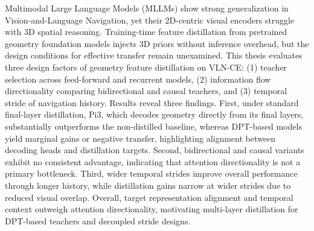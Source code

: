 Multimodal Large Language Models (MLLMs) show strong generalization in Vision-and-Language Navigation, yet their 2D-centric visual encoders struggle with 3D spatial reasoning. Training-time feature distillation from pretrained geometry foundation models injects 3D priors without inference overhead, but the design conditions for effective transfer remain unexamined.  This thesis evaluates three design factors of geometry feature distillation on VLN-CE: (1) teacher selection across feed-forward and recurrent models, (2) information flow directionality comparing bidirectional and causal teachers, and (3) temporal stride of navigation history. Results reveal three findings. First, under standard final-layer distillation, Pi3, which decodes geometry directly from its final layers, substantially outperforms the non-distilled baseline, whereas DPT-based models yield marginal gains or negative transfer, highlighting alignment between decoding heads and distillation targets. Second, bidirectional and causal variants exhibit no consistent advantage, indicating that attention directionality is not a primary bottleneck. Third, wider temporal strides improve overall performance through longer history, while distillation gains narrow at wider strides due to reduced visual overlap. Overall, target representation alignment and temporal context outweigh attention directionality, motivating multi-layer distillation for DPT-based teachers and decoupled stride designs.
